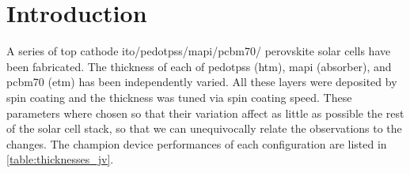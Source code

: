 
\section{Introduction}
A series of top cathode \gls{ito}\-/\gls{pedotpss}\-/\gls{mapi}\-/\gls{pcbm70}\-/ perovskite solar cells have been fabricated.
The thickness of each of \gls{pedotpss} (\gls{htm}), \gls{mapi} (absorber), and \gls{pcbm70} (\gls{etm}) has been independently varied.
All these layers were deposited by spin coating and the thickness was tuned via spin coating speed.
These parameters where chosen so that their variation affect as little as possible the rest of the solar cell stack, so that we can unequivocally relate the observations to the changes.
The champion device performances of each configuration are listed in \cref{table:thicknesses_jv}.

